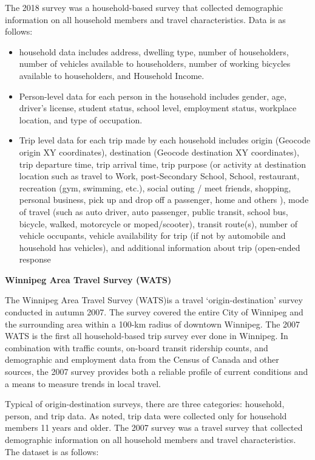 \documentclass[12pt,twoside]{reedthesis}
\begin{document}
The 2018 survey was a household-based survey that collected demographic information on all household members and travel characteristics. Data is as follows:
\begin{itemize}
\item
  household data includes address, dwelling type, number of householders, number of vehicles available to householders, number of working bicycles available to householders, and Household Income.
\item
  Person-level data for each person in the household includes gender, age, driver's license, student status, school level, employment status, workplace location, and type of occupation.
\item
  Trip level data for each trip made by each household includes origin (Geocode origin XY coordinates), destination (Geocode destination XY coordinates), trip departure time, trip arrival time, trip purpose (or activity at destination location such as travel to Work, post-Secondary School, School, restaurant, recreation (gym, swimming, etc.), social outing / meet friends, shopping, personal business, pick up and drop off a passenger, home and others ), mode of travel (such as auto driver, auto passenger, public transit, school bus, bicycle, walked, motorcycle or moped/scooter), transit route(s), number of vehicle occupants, vehicle availability for trip (if not by automobile and household has vehicles), and additional information about trip (open-ended response
\end{itemize}
\textbf{Winnipeg Area Travel Survey (WATS)}

The Winnipeg Area Travel Survey (WATS)is a travel `origin-destination' survey conducted in autumn 2007. The survey covered the entire City of Winnipeg and the surrounding area within a 100-km radius of downtown Winnipeg. The 2007 WATS is the first all household-based trip survey ever done in Winnipeg. In combination with traffic counts, on-board transit ridership counts, and demographic and employment data from the Census of Canada and other sources, the 2007 survey provides both a reliable profile of current conditions and a means to measure trends in local travel.

Typical of origin-destination surveys, there are three categories: household, person, and trip data. As noted, trip data were collected only for household members 11 years and older. The 2007 survey was a travel survey that collected demographic information on all household members and travel characteristics. The dataset is as follows:
\end{document}
